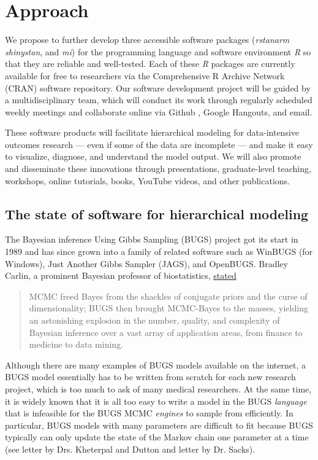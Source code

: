 \documentclass[11pt,notitlepage]{article}
\begin{document}
\section*{Approach}

We propose to further develop three accessible software packages (\textit{rstanarm} 
\textit{shinystan}, and \textit{mi}) for the programming language and software environment 
\textit{R} so that they are reliable and well-tested. Each of these \textit{R} packages are currently available for 
free to researchers via the Comprehensive R Archive Network (CRAN) software repository. Our software development project will be guided by a multidisciplinary 
team, which will conduct its work through regularly scheduled weekly meetings and collaborate online via Github 
\cite{Chacon2009ProGit}, Google Hangouts, and email.

These software products will facilitate hierarchical modeling for data-intensive outcomes research ---
even if some of the data are incomplete --- and make it easy to visualize, diagnose, and understand the model
output. We will also promote and disseminate these innovations through presentations, graduate-level teaching, 
workshops, online tutorials, books, YouTube videos, and other publications.

\subsection*{The state of software for hierarchical modeling}

The Bayesian inference Using Gibbs Sampling (BUGS) project got its start in 1989 and has 
since grown into a family of related software such as WinBUGS (for Windows), Just Another
Gibbs Sampler (JAGS), and OpenBUGS. Bradley Carlin, a prominent Bayesian professor of biostatistics, 
\href{http://www.mrc-bsu.cam.ac.uk/software/bugs/the-bugs-project-the-bugs-book/the-bugs-book-reviews/}{stated}
\begin{quote}
MCMC freed Bayes from the shackles of conjugate priors and the curse of dimensionality; 
BUGS then brought MCMC-Bayes to the masses, yielding an astonishing explosion in the number, 
quality, and complexity of Bayesian inference over a vast array of application areas, from 
finance to medicine to data mining.
\end{quote}
Although there are many examples of BUGS models available on the internet, a BUGS model
essentially has to be written from scratch for each new research project, which is too much
to ask of many medical researchers. At the same time, it is widely known that it is all too easy to 
write a model in the BUGS \textit{language} that is infeasible for the BUGS MCMC \textit{engines} 
to sample from efficiently. In particular, BUGS models with many parameters are difficult to fit 
because BUGS typically can only update the state of the Markov chain one parameter at a time
(see letter by Drs. Kheterpal and Dutton and letter by Dr. Sacks).
\end{document}
